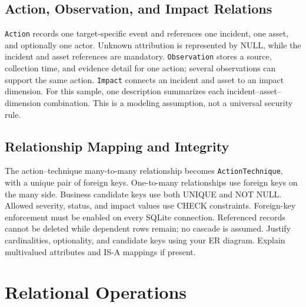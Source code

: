 \documentclass[sigconf]{acmart}
\newcommand{\guidance}[1]{{\color{blue}#1}}
\begin{document}
\subsection{Action, Observation, and Impact Relations}
\texttt{Action} records one target-specific event and references one incident,
one asset, and optionally one actor. Unknown attribution is represented by
NULL, while the incident and asset references are mandatory.
\texttt{Observation} stores a source, collection time, and evidence detail
for one action; several observations can support the same action.
\texttt{Impact} connects an incident and asset to an impact dimension.
For this sample, one description summarizes each incident--asset--dimension
combination. This is a modeling assumption, not a universal security rule.

\subsection{Relationship Mapping and Integrity}
The action--technique many-to-many relationship becomes
\texttt{ActionTechnique}, with a unique pair of foreign keys.
One-to-many relationships use foreign keys on the many side.
Business candidate keys use both UNIQUE and NOT NULL. Allowed severity,
status, and impact values use CHECK constraints. Foreign-key enforcement
must be enabled on every SQLite connection. Referenced records cannot be
deleted while dependent rows remain; no cascade is assumed.
\guidance{Justify cardinalities, optionality, and candidate keys using your
ER diagram. Explain multivalued attributes and IS-A mappings if present.}

\section{Relational Operations}\label{sec:operations}
\end{document}
